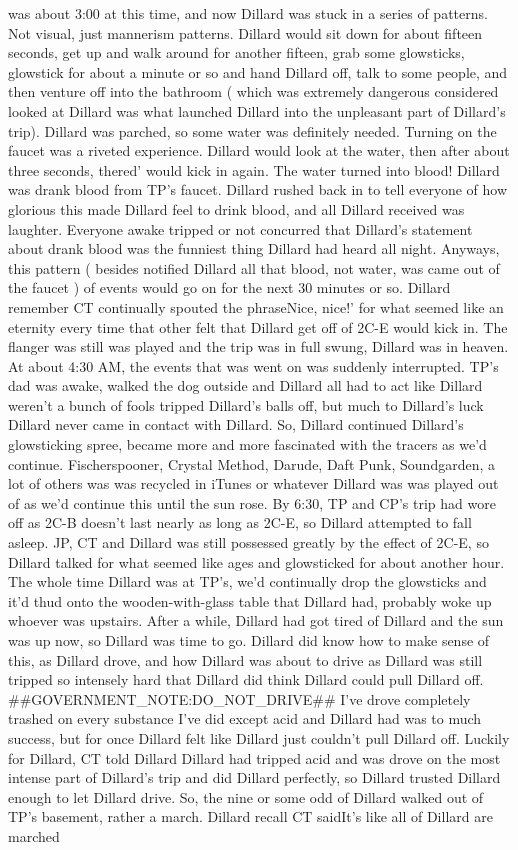 \documentclass[12pt]{book}
\begin{document}
was about 3:00 at this time, and now Dillard was stuck in a series of patterns. Not visual, just mannerism patterns. Dillard would sit down for about fifteen seconds, get up and walk around for another fifteen, grab some glowsticks, glowstick for about a minute or so and hand Dillard off, talk to some people, and then venture off into the bathroom ( which was extremely dangerous considered looked at Dillard was what launched Dillard into the unpleasant part of Dillard's trip). Dillard was parched, so some water was definitely needed. Turning on the faucet was a riveted experience. Dillard would look at the water, then after about three seconds, thered' would kick in again. The water turned into blood! Dillard was drank blood from TP's faucet. Dillard rushed back in to tell everyone of how glorious this made Dillard feel to drink blood, and all Dillard received was laughter. Everyone awake tripped or not concurred that Dillard's statement about drank blood was the funniest thing Dillard had heard all night. Anyways, this pattern ( besides notified Dillard all that blood, not water, was came out of the faucet ) of events would go on for the next 30 minutes or so. Dillard remember CT continually spouted the phraseNice, nice!' for what seemed like an eternity every time that other felt that Dillard get off of 2C-E would kick in. The flanger was still was played and the trip was in full swung, Dillard was in heaven. At about 4:30 AM, the events that was went on was suddenly interrupted. TP's dad was awake, walked the dog outside and Dillard all had to act like Dillard weren't a bunch of fools tripped Dillard's balls off, but much to Dillard's luck Dillard never came in contact with Dillard. So, Dillard continued Dillard's glowsticking spree, became more and more fascinated with the tracers as we'd continue. Fischerspooner, Crystal Method, Darude, Daft Punk, Soundgarden, a lot of others was was recycled in iTunes or whatever Dillard was was played out of as we'd continue this until the sun rose. By 6:30, TP and CP's trip had wore off as 2C-B doesn't last nearly as long as 2C-E, so Dillard attempted to fall asleep. JP, CT and Dillard was still possessed greatly by the effect of 2C-E, so Dillard talked for what seemed like ages and glowsticked for about another hour. The whole time Dillard was at TP's, we'd continually drop the glowsticks and it'd thud onto the wooden-with-glass table that Dillard had, probably woke up whoever was upstairs. After a while, Dillard had got tired of Dillard and the sun was up now, so Dillard was time to go. Dillard did know how to make sense of this, as Dillard drove, and how Dillard was about to drive as Dillard was still tripped so intensely hard that Dillard did think Dillard could pull Dillard off. \#\#GOVERNMENT\_NOTE:DO\_NOT\_DRIVE\#\# I've drove completely trashed on every substance I've did except acid and Dillard had was to much success, but for once Dillard felt like Dillard just couldn't pull Dillard off. Luckily for Dillard, CT told Dillard Dillard had tripped acid and was drove on the most intense part of Dillard's trip and did Dillard perfectly, so Dillard trusted Dillard enough to let Dillard drive. So, the nine or some odd of Dillard walked out of TP's basement, rather a march. Dillard recall CT saidIt's like all of Dillard are marched 
\end{document}
